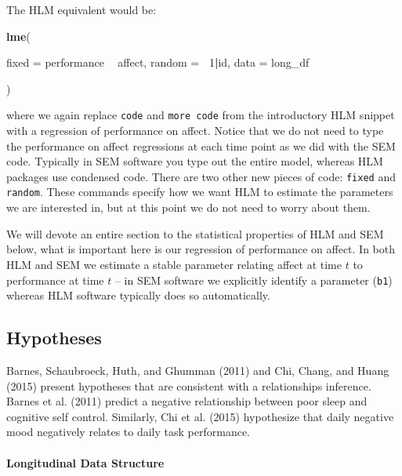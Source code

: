\documentclass[english,,man]{apa6}
\newenvironment{Shaded}{\begin{snugshade}}{\end{snugshade}}
\newcommand{\DataTypeTok}[1]{\textcolor[rgb]{0.13,0.29,0.53}{#1}}
\newcommand{\DecValTok}[1]{\textcolor[rgb]{0.00,0.00,0.81}{#1}}
\newcommand{\KeywordTok}[1]{\textcolor[rgb]{0.13,0.29,0.53}{\textbf{#1}}}
\newcommand{\NormalTok}[1]{#1}
\newcommand{\OperatorTok}[1]{\textcolor[rgb]{0.81,0.36,0.00}{\textbf{#1}}}
\newcommand{\StringTok}[1]{\textcolor[rgb]{0.31,0.60,0.02}{#1}}
\let\oldparagraph\paragraph
\renewcommand{\paragraph}[1]{\oldparagraph{#1}\mbox{}}
\theoremstyle{definition}
\theoremstyle{definition}
\theoremstyle{definition}
\theoremstyle{remark}
\begin{document}
The HLM equivalent would be:

\begin{Shaded}
\begin{Highlighting}[]
\KeywordTok{lme}\NormalTok{(                                   }
  
  \DataTypeTok{fixed =}\NormalTok{ performance }\OperatorTok{~}\StringTok{ }\NormalTok{affect,}
  \DataTypeTok{random =} \OperatorTok{~}\DecValTok{1}\OperatorTok{|}\NormalTok{id,}
  \DataTypeTok{data =}\NormalTok{ long_df}
  
\NormalTok{)}
\end{Highlighting}
\end{Shaded}

\noindent where we again replace \texttt{code} and \texttt{more\ code}
from the introductory HLM snippet with a regression of performance on
affect. Notice that we do not need to type the performance on affect
regressions at each time point as we did with the SEM code. Typically in
SEM software you type out the entire model, whereas HLM packages use
condensed code. There are two other new pieces of code: \texttt{fixed}
and \texttt{random}. These commands specify how we want HLM to estimate
the parameters we are interested in, but at this point we do not need to
worry about them.

We will devote an entire section to the statistical properties of HLM
and SEM below, what is important here is our regression of performance
on affect. In both HLM and SEM we estimate a stable parameter relating
affect at time \(t\) to performance at time \(t\) -- in SEM software we
explicitly identify a parameter (\texttt{b1}) whereas HLM software
typically does so automatically.

\hypertarget{hypotheses}{%
\subsection{Hypotheses}\label{hypotheses}}

Barnes, Schaubroeck, Huth, and Ghumman (2011) and Chi, Chang, and Huang
(2015) present hypotheses that are consistent with a relationships
inference. Barnes et al. (2011) predict a negative relationship between
poor sleep and cognitive self control. Similarly, Chi et al. (2015)
hypothesize that daily negative mood negatively relates to daily task
performance.

\hypertarget{longitudinal-data-structure}{%
\paragraph{Longitudinal Data
Structure}\label{longitudinal-data-structure}}
\end{document}
